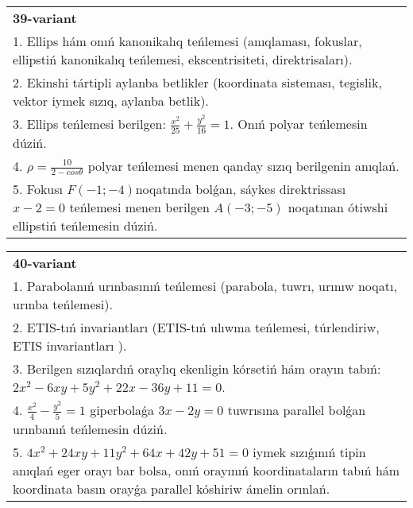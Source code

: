 \documentclass{article}
\begin{document}
\begin{tabular}{m{17cm}}
\textbf{39-variant}\\
1. Ellips hám onıń kanonikalıq teńlemesi (anıqlaması, fokuslar, ellipstiń kanonikalıq teńlemesi, ekscentrisiteti, direktrisaları).\\

2. Ekinshi tártipli aylanba betlikler (koordinata sisteması, tegislik, vektor iymek sızıq, aylanba betlik).\\

3. Ellips teńlemesi berilgen: $\frac{x^2}{25}+\frac{y^2}{16}=1$. Onıń polyar teńlemesin dúziń.\\

4. $\rho = \frac{10}{2 - cos\theta}$ polyar teńlemesi menen qanday sızıq berilgenin anıqlań.  \\

5. Fokusı $F( - 1; - 4)$noqatında bolǵan, sáykes direktrissası $x - 2 = 0$ teńlemesi menen berilgen $A( - 3; - 5)$ noqatınan ótiwshi ellipstiń teńlemesin dúziń.  
\end{tabular}
\vspace{1cm}


\begin{tabular}{m{17cm}}
\textbf{40-variant}\\
1. Parabolanıń urınbasınıń teńlemesi (parabola, tuwrı, urınıw noqatı, urınba teńlemesi).\\

2. ETIS-tıń invariantları (ETIS-tıń ulıwma teńlemesi, túrlendiriw, ETIS invariantları ).\\

3. Berilgen sızıqlardıń oraylıq ekenligin kórsetiń hám orayın tabıń: $2 x^{2}-6 xy+5 y^{2}+22 x-36 y+11=0$.\\

4. $\frac{x^{2}}{4} - \frac{y^{2}}{5} = 1$ giperbolaǵa $3x - 2y = 0$ tuwrısına parallel bolǵan urınbanıń teńlemesin dúziń.  \\

5. $4x^{2} + 24xy + 11y^{2} + 64x + 42y + 51 = 0$ iymek sızıǵınıń tipin anıqlań eger orayı bar bolsa, onıń orayınıń koordinataların tabıń hám koordinata basın orayǵa parallel kóshiriw ámelin orınlań.  
\end{tabular}
\vspace{1cm}
\end{document}
